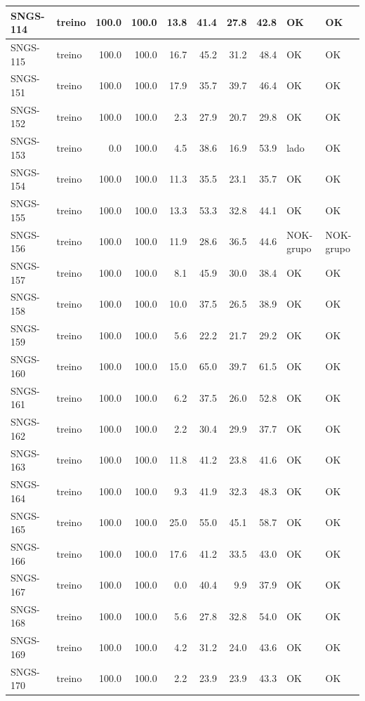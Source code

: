 \begin{small}
\begin{longtable}{|l|l|r|r|r|r|r|r|l|l|}
SNGS-114 & treino & 100.0 & 100.0 & 13.8 & 41.4 & 27.8 & 42.8 & OK & OK \\ \hline
SNGS-115 & treino & 100.0 & 100.0 & 16.7 & 45.2 & 31.2 & 48.4 & OK & OK \\ \hline
SNGS-151 & treino & 100.0 & 100.0 & 17.9 & 35.7 & 39.7 & 46.4 & OK & OK \\ \hline
SNGS-152 & treino & 100.0 & 100.0 & 2.3 & 27.9 & 20.7 & 29.8 & OK & OK \\ \hline
SNGS-153 & treino & 0.0 & 100.0 & 4.5 & 38.6 & 16.9 & 53.9 & lado & OK \\ \hline
SNGS-154 & treino & 100.0 & 100.0 & 11.3 & 35.5 & 23.1 & 35.7 & OK & OK \\ \hline
SNGS-155 & treino & 100.0 & 100.0 & 13.3 & 53.3 & 32.8 & 44.1 & OK & OK \\ \hline
SNGS-156 & treino & 100.0 & 100.0 & 11.9 & 28.6 & 36.5 & 44.6 & NOK-grupo & NOK-grupo \\ \hline
SNGS-157 & treino & 100.0 & 100.0 & 8.1 & 45.9 & 30.0 & 38.4 & OK & OK \\ \hline
SNGS-158 & treino & 100.0 & 100.0 & 10.0 & 37.5 & 26.5 & 38.9 & OK & OK \\ \hline
SNGS-159 & treino & 100.0 & 100.0 & 5.6 & 22.2 & 21.7 & 29.2 & OK & OK \\ \hline
SNGS-160 & treino & 100.0 & 100.0 & 15.0 & 65.0 & 39.7 & 61.5 & OK & OK \\ \hline
SNGS-161 & treino & 100.0 & 100.0 & 6.2 & 37.5 & 26.0 & 52.8 & OK & OK \\ \hline
SNGS-162 & treino & 100.0 & 100.0 & 2.2 & 30.4 & 29.9 & 37.7 & OK & OK \\ \hline
SNGS-163 & treino & 100.0 & 100.0 & 11.8 & 41.2 & 23.8 & 41.6 & OK & OK \\ \hline
SNGS-164 & treino & 100.0 & 100.0 & 9.3 & 41.9 & 32.3 & 48.3 & OK & OK \\ \hline
SNGS-165 & treino & 100.0 & 100.0 & 25.0 & 55.0 & 45.1 & 58.7 & OK & OK \\ \hline
SNGS-166 & treino & 100.0 & 100.0 & 17.6 & 41.2 & 33.5 & 43.0 & OK & OK \\ \hline
SNGS-167 & treino & 100.0 & 100.0 & 0.0 & 40.4 & 9.9 & 37.9 & OK & OK \\ \hline
SNGS-168 & treino & 100.0 & 100.0 & 5.6 & 27.8 & 32.8 & 54.0 & OK & OK \\ \hline
SNGS-169 & treino & 100.0 & 100.0 & 4.2 & 31.2 & 24.0 & 43.6 & OK & OK \\ \hline
SNGS-170 & treino & 100.0 & 100.0 & 2.2 & 23.9 & 23.9 & 43.3 & OK & OK \\ \hline
\end{longtable}
\end{small}
